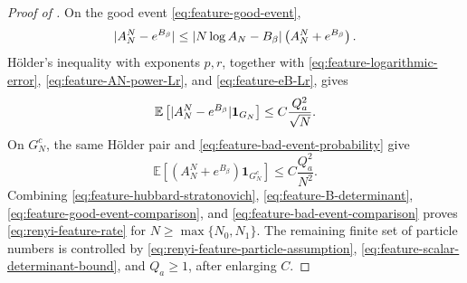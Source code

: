 \documentclass[11pt,reqno]{amsart}
\numberwithin{equation}{section}
\theoremstyle{plain}
\theoremstyle{definition}
\DeclarePairedDelimiter{\abs}{\lvert}{\rvert}
\newcommand{\E}{\mathbb E}
\newcommand{\one}{\mathbf 1}
\newcommand{\be}{\beta}
\begin{document}
\begin{proof}[Proof of ]
On the good event \eqref{eq:feature-good-event},
\begin{equation}
 \abs{A_N^N-e^{B_{\be}}}
 \leq\abs{N\log A_N-B_{\be}}
 \left(A_N^N+e^{B_{\be}}\right).
 \label{eq:feature-exponential-difference}
\end{equation}
H\"older's inequality with exponents $p,r$, together with \eqref{eq:feature-logarithmic-error}, \eqref{eq:feature-AN-power-Lr}, and \eqref{eq:feature-eB-Lr}, gives
\begin{equation}
 \E\left[\abs{A_N^N-e^{B_{\be}}}\one_{G_N}\right]
 \leq C\frac{Q_a^2}{\sqrt N}.
 \label{eq:feature-good-event-comparison}
\end{equation}
On $G_N^c$, the same H\"older pair and \eqref{eq:feature-bad-event-probability} give
\begin{equation}
 \E\left[(A_N^N+e^{B_{\be}})\one_{G_N^c}\right]
 \leq C\frac{Q_a^2}{N^2}.
 \label{eq:feature-bad-event-comparison}
\end{equation}
Combining \eqref{eq:feature-hubbard-stratonovich}, \eqref{eq:feature-B-determinant}, \eqref{eq:feature-good-event-comparison}, and \eqref{eq:feature-bad-event-comparison} proves \eqref{eq:renyi-feature-rate} for $N\geq\max\{N_0,N_1\}$.  The remaining finite set of particle numbers is controlled by \eqref{eq:renyi-feature-particle-assumption}, \eqref{eq:feature-scalar-determinant-bound}, and $Q_a\geq1$, after enlarging $C$.
\end{proof}
\end{document}
